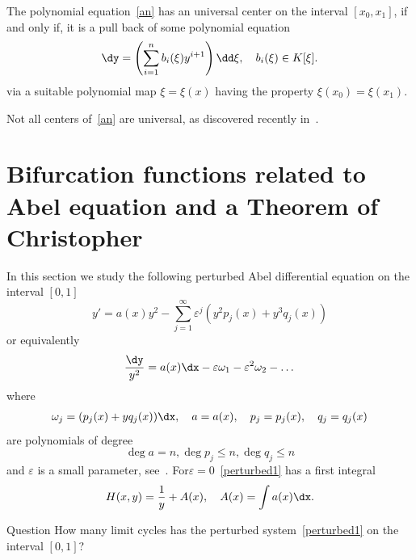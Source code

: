 \begin{theo}\label{universal}
The polynomial equation~\eqref{an} has an universal center on the interval $[x_0,x_1]$, if and only if, it is a pull back of some polynomial equation
\begin{equation}\label{bn}
\dy = \left(\sum_{i=1}^n b_i(\xi) y^{i+1}\right) \dd\xi,\quad b_i(\xi) \in K[\xi].
\end{equation}
via a suitable polynomial map $\xi = \xi (x)$ having the property $\xi(x_0)=\xi(x_1)$.
\end{theo}

Not all centers of~\eqref{an} are universal, as discovered recently in~\cite{ggs18}.


\section{Bifurcation functions related to Abel equation and a Theorem of Christopher}\label{section3}

In this section we study the following perturbed Abel differential equation on the interval $[0,1]$
\[
y' = a(x) y^2 - \sum_{j= 1}^\infty \varepsilon^j\left(y^2 p_j(x)+ y^3 q_j(x)\right)
\]
or equivalently
\begin{equation}\label{perturbed1}
\frac{\dy}{y^2} = a(x) \dx - \varepsilon \omega_1 - \varepsilon^2\omega_2 - \dots
\end{equation}
where
\begin{gather*}
\omega_j = (p_j(x)+ y q_j(x)) \dx,\quad
a=a(x),\quad p_j =p_j(x),\quad q_j=q_j(x)
\end{gather*}
are polynomials of degree
\[
\deg a = n, \deg p_j \leq n, \deg q_j \leq n
\]
and $\varepsilon$ is a small parameter, see~\cite{bfy98,bfy99,bfy00,chri00,yomd03}. For\linebreak $\varepsilon = 0$~\eqref{perturbed1} has a first integral
\[
H(x,y)= \frac1y + A(x), \quad A(x) = \int a(x) \dx.
\]

\begin{enonce*}[plain]{Question}
How many limit cycles has the perturbed system~\eqref{perturbed1} on the interval $[0,1]$?
\end{enonce*}

